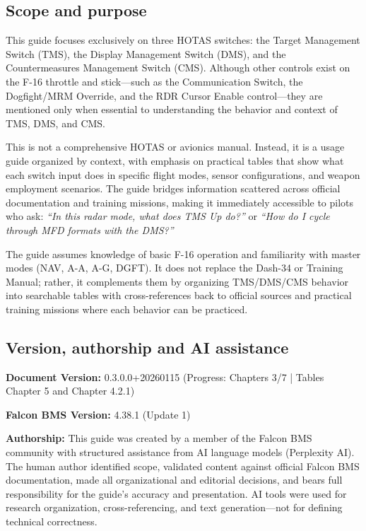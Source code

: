 \documentclass[11pt,a4paper]{article}
\newcommand{\docversion}{0.3.0.0} %
\newcommand{\docbuild}{20260115}
\newcommand{\chapterscompletedof}{3/7}
\newcommand{\tablesfilledpct}{Chapter 5 and Chapter 4.2.1}
\newcommand{\fulldocversion}{\docversion+\docbuild} %
\begin{document}
\subsection{Scope and purpose}

This guide focuses exclusively on three HOTAS switches: the Target Management Switch (TMS), the Display Management Switch (DMS), and the Countermeasures Management Switch (CMS). Although other controls exist on the F-16 throttle and stick---such as the Communication Switch, the Dogfight/MRM Override, and the RDR Cursor Enable control---they are mentioned only when essential to understanding the behavior and context of TMS, DMS, and CMS.

This is not a comprehensive HOTAS or avionics manual. Instead, it is a usage guide organized by context, with emphasis on practical tables that show what each switch input does in specific flight modes, sensor configurations, and weapon employment scenarios. The guide bridges information scattered across official documentation and training missions, making it immediately accessible to pilots who ask: \emph{``In this radar mode, what does TMS Up do?''} or \emph{``How do I cycle through MFD formats with the DMS?''}

The guide assumes knowledge of basic F-16 operation and familiarity with master modes (NAV, A-A, A-G, DGFT). It does not replace the Dash-34 or Training Manual; rather, it complements them by organizing TMS/DMS/CMS behavior into searchable tables with cross-references back to official sources and practical training missions where each behavior can be practiced.

\subsection{Version, authorship and AI assistance}

\textbf{Document Version:} \fulldocversion{} (Progress: Chapters \chapterscompletedof{} | Tables \tablesfilledpct)

\textbf{Falcon BMS Version:} 4.38.1 (Update 1)

\textbf{Authorship:} This guide was created by a member of the Falcon BMS community with structured assistance from AI language models (Perplexity AI). The human author identified scope, validated content against official Falcon BMS documentation, made all organizational and editorial decisions, and bears full responsibility for the guide's accuracy and presentation. AI tools were used for research organization, cross-referencing, and text generation---not for defining technical correctness.
\end{document}
